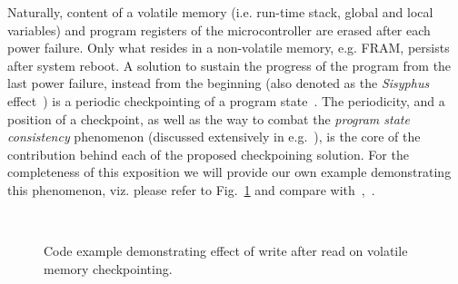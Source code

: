 Naturally, content of a volatile memory (i.e. run-time stack, global and local variables) and program registers of the microcontroller are erased after each power failure. Only what resides in a non-volatile memory, e.g. FRAM, persists after system reboot. A solution to sustain the progress of the program from the last power failure, instead from the beginning (also denoted as the \emph{Sisyphus} effect~\cite[Sec. 2]{mementos}) is a periodic checkpointing of a program state~\cite{mementos,hibernusplusplus,quickrecall,idetic}. The periodicity, and a position of a checkpoint, as well as the way to combat the \emph{program state consistency} phenomenon (discussed extensively in e.g.~\cite{chain,alpaca}), is the core of the contribution behind each of the proposed checkpoining solution. For the completeness of this exposition we will provide our own example demonstrating this phenomenon, viz. please refer to Fig.~\ref{fig:code_demo_incosistency} and compare with~\cite[Sec 2.3]{alpaca},~\cite[Sec. 2.1]{chain}.

\begin{figure}
	\centering
	\\
	\caption{Code example demonstrating effect of write after read on volatile memory checkpointing.}
	\label{fig:code_demo_incosistency}
\end{figure}

